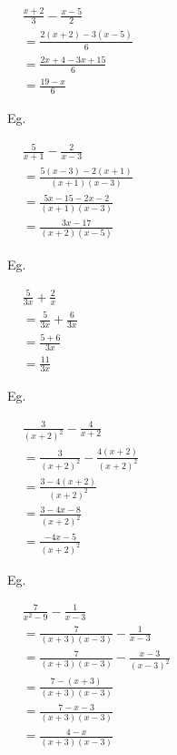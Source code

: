 \documentclass[twocolumn]{article}
\begin{document}
\noindent 
$
\begin{aligned}
	& \frac{x+2}{3}-\frac{x-5}{2} \\
	& =\frac{2(x+2)-3(x-5)}{6} \\
	& =\frac{2 x+4-3 x+15}{6} \\
	& =\frac{19-x}{6}
\end{aligned}
$

\bigskip 

\noindent 
Eg.

\noindent 
$
\begin{aligned}
	& \frac{5}{x+1}-\frac{2}{x-3} \\
	& =\frac{5(x-3)-2(x+1)}{(x+1)(x-3)} \\
	& =\frac{5 x-15-2 x-2}{(x+1)(x-3)} \\
	& =\frac{3 x-17}{(x+2)(x-5)}
\end{aligned}
$

\bigskip 

\noindent 
Eg.

\noindent 
$
\begin{aligned}
	& \frac{5}{3 x}+\frac{2}{x} \\
	& = \frac{5}{3 x}+\frac{6}{3x} \\
	& =\frac{5+6}{3 x} \\
	& =\frac{11}{3 x}
\end{aligned}
$

\bigskip 

\noindent 
Eg. 

\noindent 
$
\begin{aligned}
	& \frac{3}{(x+2)^2}-\frac{4}{x+2} \\
	& =\frac{3}{(x+2)^2}-\frac{4(x+2)}{(x+2)^2} \\	
	& =\frac{3-4(x+2)}{(x+2)^2} \\
	& =\frac{3-4 x-8}{(x+2)^2} \\
	& =\frac{-4 x-5}{(x+2)^2}
\end{aligned}
$

\bigskip 

\noindent 
Eg. 

\noindent 
$
\begin{aligned}
	& \frac{7}{x^2-9}-\frac{1}{x-3} \\
	& =\frac{7}{(x+3)(x-3)}-\frac{1}{x-3} \\
	& =\frac{7}{(x+3)(x-3)}-\frac{x-3}{(x-3)^2} \\	
	& =\frac{7-(x+3)}{(x+3)(x-3)} \\
	& =\frac{7-x-3}{(x+3)(x-3)} \\
	& =\frac{4-x}{(x+3)(x-3)}
\end{aligned}
$
\end{document}

